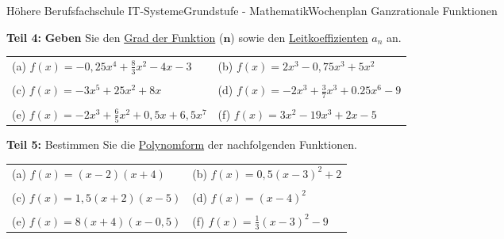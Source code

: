 \documentclass[oneside,openany,headings=optiontotoc,11pt,numbers=noenddot]{scrreprt}
\begin{document}
\begin{worksheet}{Höhere Berufsfachschule IT-Systeme}{Grundstufe - Mathematik}{Wochenplan Ganzrationale Funktionen}
\begin{framed}
		\end{framed}
		\begin{framed}
			\noindent
			\textbf{Teil 4:} \textbf{Geben} Sie den \underline{Grad der Funktion} (\(\mathbf{n}\)) sowie den \underline{Leitkoeffizienten} \(a_n\) an.\\
			\par\noindent
			\begin{tabularx}{\textwidth}{XX}
				(a) \(f(x) = - 0,25x^4 + \frac{8}{3}x^2 - 4x - 3\) & (b) \(f(x) = 2x^3- 0,75x^3 + 5x^2\)\\
				\\
				(c) \(f(x) = -3x^5 + 25x^2 + 8x\) & (d) \(f(x) = -2x^3 + \frac{3}{7}x^3 + 0.25x^6 - 9\)\\
				\\
				(e) \(f(x) = -2x^3 + \frac{6}{5}x^2 + 0,5x + 6,5x^7\) & (f) \(f(x) = 3x^2 -19x^3 + 2x - 5\)\\
			\end{tabularx}			
		\end{framed}
		\begin{framed}
			\noindent
			\textbf{Teil 5:} Bestimmen Sie die \underline{Polynomform} der nachfolgenden Funktionen.\\
			\par\noindent
			\begin{tabularx}{\textwidth}{XX}
				(a) \(f(x) = (x-2)(x+4)\) & (b) \(f(x) = 0,5(x-3)^2 + 2\)\\
				\\
				(c) \(f(x) = 1,5(x+2)(x-5)\) & (d) \(f(x) = (x-4)^2\)\\
				\\
				(e) \(f(x) = 8(x+4)(x-0,5)\) & (f) \(f(x) = \frac{1}{3}(x-3)^2 -9\)\\
			\end{tabularx}
		\end{framed}
	\end{worksheet}
\end{document}
